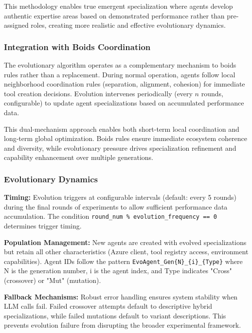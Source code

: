 This methodology enables true emergent specialization where agents develop authentic expertise areas based on demonstrated performance rather than pre-assigned roles, creating more realistic and effective evolutionary dynamics.

\subsubsection{Integration with Boids Coordination}

The evolutionary algorithm operates as a complementary mechanism to boids rules rather than a replacement. During normal operation, agents follow local neighborhood coordination rules (separation, alignment, cohesion) for immediate tool creation decisions. Evolution intervenes periodically (every $n$ rounds, configurable) to update agent specializations based on accumulated performance data.

This dual-mechanism approach enables both short-term local coordination and long-term global optimization. Boids rules ensure immediate ecosystem coherence and diversity, while evolutionary pressure drives specialization refinement and capability enhancement over multiple generations.

\subsubsection{Evolutionary Dynamics}

\textbf{Timing:} Evolution triggers at configurable intervals (default: every 5 rounds) during the final rounds of experiments to allow sufficient performance data accumulation. The condition \texttt{round\_num \% evolution\_frequency == 0} determines trigger timing.

\textbf{Population Management:} New agents are created with evolved specializations but retain all other characteristics (Azure client, tool registry access, environment capabilities). Agent IDs follow the pattern \texttt{EvoAgent\_Gen\{N\}\_\{i\}\_\{Type\}} where N is the generation number, i is the agent index, and Type indicates "Cross" (crossover) or "Mut" (mutation).

\textbf{Fallback Mechanisms:} Robust error handling ensures system stability when LLM calls fail. Failed crossover attempts default to descriptive hybrid specializations, while failed mutations default to variant descriptions. This prevents evolution failure from disrupting the broader experimental framework.


